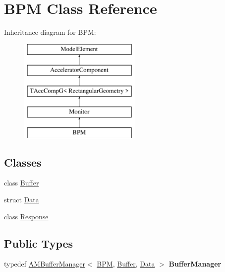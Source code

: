 \hypertarget{classBPM}{}\section{B\+PM Class Reference}
\label{classBPM}
Inheritance diagram for B\+PM\+:\begin{figure}[H]
\begin{center}
\leavevmode
\includegraphics[height=5.000000cm]{classBPM}
\end{center}
\end{figure}
\subsection*{Classes}
\begin{DoxyCompactItemize}
\item 
class \hyperlink{classBPM_1_1Buffer}{Buffer}
\item 
struct \hyperlink{structBPM_1_1Data}{Data}
\item 
class \hyperlink{classBPM_1_1Response}{Response}
\end{DoxyCompactItemize}
\subsection*{Public Types}
\begin{DoxyCompactItemize}
\item 
\mbox{\label{classBPM_a191c31480c5ccefd8ce44c84ca19ebcf}} 
typedef \hyperlink{classAMBufferManager}{A\+M\+Buffer\+Manager}$<$ \hyperlink{classBPM}{B\+PM}, \hyperlink{classBPM_1_1Buffer}{Buffer}, \hyperlink{structBPM_1_1Data}{Data} $>$ {\bfseries Buffer\+Manager}
\end{DoxyCompactItemize}
